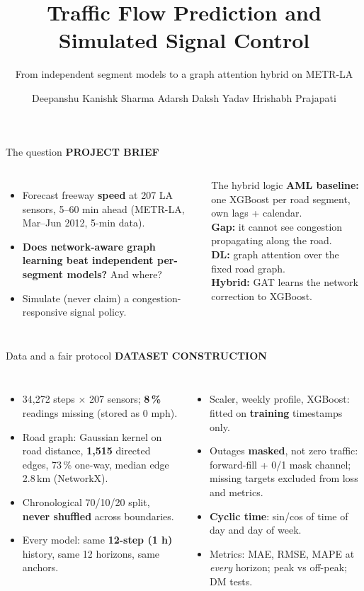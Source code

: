 \documentclass[aspectratio=169,11pt]{beamer}
\title{Traffic Flow Prediction and Simulated Signal Control}
\subtitle{From independent segment models to a graph attention hybrid on METR-LA}
\author{Deepanshu \textperiodcentered{} Kanishk Sharma \textperiodcentered{} Adarsh \textperiodcentered{} Daksh Yadav \textperiodcentered{} Hrishabh Prajapati}
\institute{Applied Machine Learning \textperiodcentered{} Phase 2: Deep Learning and Hybrid}
\date{}
\newcommand{\kicker}[1]{{\color{accent}\scriptsize\bfseries\MakeUppercase{#1}}\par\vspace{0.3em}}
\newcommand{\hl}[1]{{\color{accent}\bfseries #1}}
\begin{document}
\begin{frame}[plain]
\titlepage
\end{frame}

\begin{frame}{The question}
\kicker{Project brief}
\begin{columns}[T]
\begin{itemize}\setlength\itemsep{0.6em}
\item Forecast freeway \hl{speed} at 207 LA sensors, 5--60 min ahead (METR-LA, Mar--Jun 2012, 5-min data).
\item \textbf{Does network-aware graph learning beat independent per-segment models?} And where?
\item Simulate (never claim) a congestion-responsive signal policy.
\end{itemize}
\begin{block}{The hybrid logic}
\footnotesize
\textbf{AML baseline:} one XGBoost per road segment, own lags + calendar.\\[0.3em]
\textbf{Gap:} it cannot see congestion propagating along the road.\\[0.3em]
\textbf{DL:} graph attention over the fixed road graph.\\[0.3em]
\textbf{Hybrid:} GAT learns the network correction to XGBoost.
\end{block}
\end{columns}
\end{frame}

\begin{frame}{Data and a fair protocol}
\kicker{Dataset construction}
\begin{columns}[T]
\begin{itemize}\setlength\itemsep{0.45em}
\item 34,272 steps $\times$ 207 sensors; \hl{8\,\%} readings missing (stored as 0 mph).
\item Road graph: Gaussian kernel on road distance, \hl{1,515} directed edges, 73\,\% one-way, median edge 2.8\,km (NetworkX).
\item Chronological 70/10/20 split, \hl{never shuffled} across boundaries.
\item Every model: same \hl{12-step (1 h)} history, same 12 horizons, same anchors.
\end{itemize}
\begin{itemize}\setlength\itemsep{0.45em}
\item Scaler, weekly profile, XGBoost: fitted on \hl{training} timestamps only.
\item Outages \hl{masked}, not zero traffic: forward-fill + 0/1 mask channel; missing targets excluded from loss and metrics.
\item \hl{Cyclic time}: sin/cos of time of day and day of week.
\item Metrics: MAE, RMSE, MAPE at \emph{every} horizon; peak vs off-peak; DM tests.
\end{itemize}
\end{columns}
\end{frame}
\end{document}
